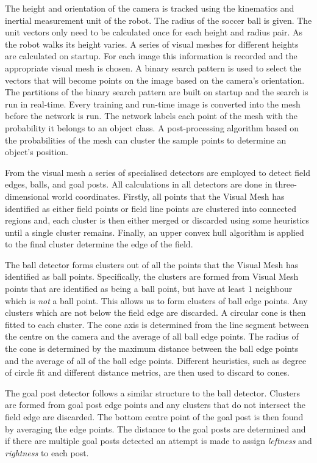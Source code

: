 \documentclass{llncs}
\begin{document}
The height and orientation of the camera is tracked using the kinematics and inertial measurement unit of the robot. The radius of the soccer ball is given. The unit vectors only need to be calculated once for each height and radius pair. As the robot walks its height varies. A series of visual meshes for different heights are calculated on startup. For each image this information is recorded and the appropriate visual mesh is chosen. A binary search pattern is used to select the vectors that will become points on the image based on the camera's orientation. The partitions of the binary search pattern are built on startup and the search is run in real-time. Every training and run-time image is converted into the mesh before the network is run. The network labels each point of the mesh with the probability it belongs to an object class. A post-processing algorithm based on the probabilities of the mesh can cluster the sample points to determine an object's position.

From the visual mesh a series of specialised detectors are employed to detect field edges, balls, and goal posts. All calculations in all detectors are done in three-dimensional world coordinates. Firstly, all points that the Visual Mesh has identified as either field points or field line points are clustered into connected regions and, each cluster is then either merged or discarded using some heuristics until a single cluster remains. Finally, an upper convex hull algorithm is applied to the final cluster determine the edge of the field.

The ball detector forms clusters out of all the points that the Visual Mesh has identified as ball points. Specifically, the clusters are formed from Visual Mesh points that are identified as being a ball point, but have at least $1$ neighbour which is \emph{not} a ball point. This allows us to form clusters of ball edge points. Any clusters which are not below the field edge are discarded. A circular cone is then fitted to each cluster. The cone axis is determined from the line segment between the centre on the camera and the average of all ball edge points. The radius of the cone is determined by the maximum distance between the ball edge points and the average of all of the ball edge points. Different heuristics, such as degree of circle fit and different distance metrics, are then used to discard to cones.

The goal post detector follows a similar structure to the ball detector. Clusters are formed from goal post edge points and any clusters that do not intersect the field edge are discarded. The bottom centre point of the goal post is then found by averaging the edge points. The distance to the goal posts are determined and if there are multiple goal posts detected an attempt is made to assign \emph{leftness} and \emph{rightness} to each post.
\end{document}
